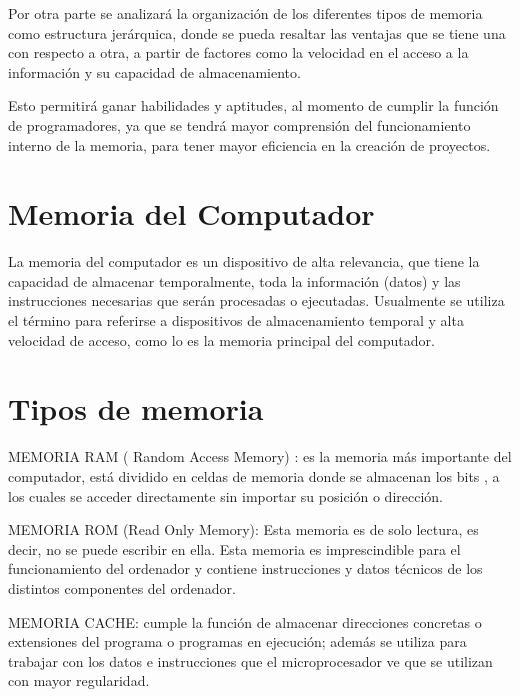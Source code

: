 \documentclass{article}
\begin{document}
\vspace{0.5cm}

Por otra parte se analizará la organización de los diferentes tipos de memoria como estructura jerárquica, donde se pueda resaltar las ventajas que se tiene una con respecto a otra, a partir de factores como la velocidad  en el acceso a la información y su capacidad de almacenamiento.

\vspace{0.5cm}

Esto permitirá ganar habilidades y aptitudes, al momento de cumplir la función de programadores, ya que se tendrá mayor comprensión del funcionamiento interno de la memoria, para tener mayor eficiencia en la creación de proyectos.

\vspace{0.5cm}

\section{Memoria del Computador}
La memoria del computador es un dispositivo de alta relevancia, que tiene la capacidad de almacenar temporalmente, toda la información (datos)  y  las instrucciones necesarias que serán procesadas o ejecutadas. Usualmente se utiliza el término para referirse a dispositivos de almacenamiento temporal y alta velocidad de acceso, como lo es la memoria principal del computador.\cite{ecuredwebsite}

\section{Tipos de memoria } \label{contenido}
MEMORIA RAM ( Random Access Memory) : es la memoria más importante del computador, está dividido en celdas de memoria donde se almacenan los bits , a los cuales  se acceder directamente sin importar su posición o dirección.\cite{tecdwebsite}
	
\vspace{0.5cm}
MEMORIA ROM (Read Only Memory): Esta memoria es de solo lectura, es decir, no se puede escribir en ella. Esta memoria es imprescindible para el funcionamiento del ordenador y contiene instrucciones y datos técnicos de los distintos componentes del ordenador.\cite{gestionwebsite}
    
\vspace{0.5cm}

MEMORIA CACHE: cumple la función de almacenar direcciones concretas o extensiones del programa o programas en ejecución; además se utiliza para trabajar con los datos e instrucciones que el microprocesador ve que se utilizan con mayor regularidad.
\end{document}

